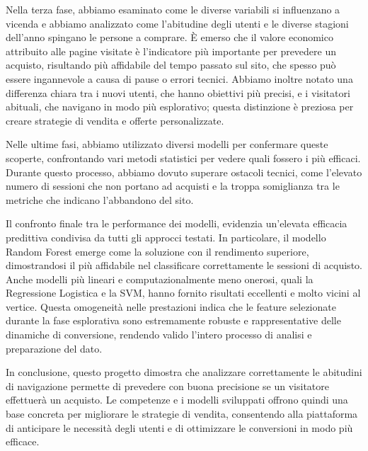 \documentclass[11pt,a4paper]{article}
\begin{document}
Nella terza fase, abbiamo esaminato come le diverse variabili si influenzano a vicenda e abbiamo analizzato come l'abitudine degli utenti e le diverse stagioni dell'anno spingano le persone a comprare. È emerso che il valore economico attribuito alle pagine visitate è l'indicatore più importante per prevedere un acquisto, risultando più affidabile del tempo passato sul sito, che spesso può essere ingannevole a causa di pause o errori tecnici. Abbiamo inoltre notato una differenza chiara tra i nuovi utenti, che hanno obiettivi più precisi, e i visitatori abituali, che navigano in modo più esplorativo; questa distinzione è preziosa per creare strategie di vendita e offerte personalizzate.

Nelle ultime fasi, abbiamo utilizzato diversi modelli per confermare queste scoperte, confrontando vari metodi statistici per vedere quali fossero i più efficaci. Durante questo processo, abbiamo dovuto superare ostacoli tecnici, come l'elevato numero di sessioni che non portano ad acquisti e la troppa somiglianza tra le metriche che indicano l'abbandono del sito.

Il confronto finale tra le performance dei modelli, evidenzia un'elevata efficacia predittiva condivisa da tutti gli approcci testati. In particolare, il modello Random Forest emerge come la soluzione con il rendimento superiore, dimostrandosi il più affidabile nel classificare correttamente le sessioni di acquisto. Anche modelli più lineari e computazionalmente meno onerosi, quali la Regressione Logistica e la SVM, hanno fornito risultati eccellenti e molto vicini al vertice. Questa omogeneità nelle prestazioni indica che le feature selezionate durante la fase esplorativa sono estremamente robuste e rappresentative delle dinamiche di conversione, rendendo valido l'intero processo di analisi e preparazione del dato.

In conclusione, questo progetto dimostra che analizzare correttamente le abitudini di navigazione permette di prevedere con buona precisione se un visitatore effettuerà un acquisto. Le competenze e i modelli sviluppati offrono quindi una base concreta per migliorare le strategie di vendita, consentendo alla piattaforma di anticipare le necessità degli utenti e di ottimizzare le conversioni in modo più efficace.



\end{document}
